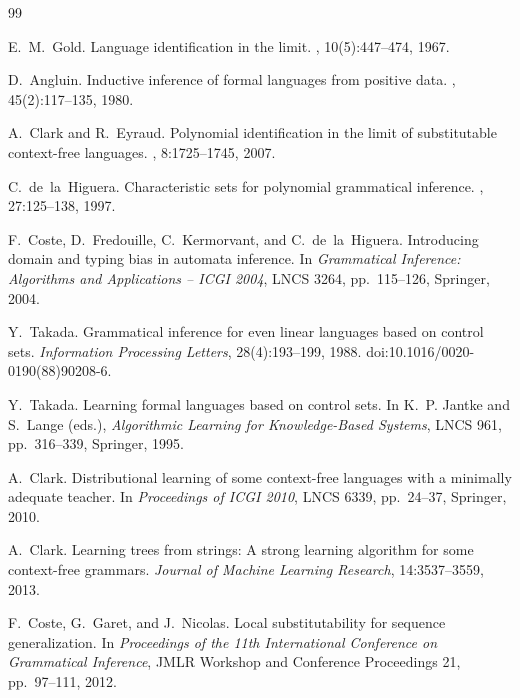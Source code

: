 \documentclass[11pt]{article}
\numberwithin{equation}{section}
\theoremstyle{plain}
\theoremstyle{definition}
\theoremstyle{remark}
\begin{document}
\small
\begin{thebibliography}{99}

E.~M.~Gold.
\newblock Language identification in the limit.
, 10(5):447--474, 1967.

D.~Angluin.
\newblock Inductive inference of formal languages from positive data.
, 45(2):117--135, 1980.

A.~Clark and R.~Eyraud.
\newblock Polynomial identification in the limit of substitutable context-free
languages.
, 8:1725--1745, 2007.

C.~de~la~Higuera.
\newblock Characteristic sets for polynomial grammatical inference.
, 27:125--138, 1997.

F.~Coste, D.~Fredouille, C.~Kermorvant, and C.~de~la~Higuera.
\newblock Introducing domain and typing bias in automata inference.
\newblock In \emph{Grammatical Inference: Algorithms and Applications -- ICGI 2004},
LNCS 3264, pp.~115--126, Springer, 2004.

Y.~Takada.
\newblock Grammatical inference for even linear languages based on control sets.
\newblock \emph{Information Processing Letters}, 28(4):193--199, 1988.
\newblock doi:10.1016/0020-0190(88)90208-6.

Y.~Takada.
\newblock Learning formal languages based on control sets.
\newblock In K.~P. Jantke and S.~Lange (eds.), \emph{Algorithmic Learning
for Knowledge-Based Systems}, LNCS 961, pp.~316--339, Springer, 1995.

A.~Clark.
\newblock Distributional learning of some context-free languages with a minimally adequate teacher.
\newblock In \emph{Proceedings of ICGI 2010}, LNCS 6339, pp.~24--37, Springer, 2010.

A.~Clark.
\newblock Learning trees from strings: A strong learning algorithm for some context-free grammars.
\newblock \emph{Journal of Machine Learning Research}, 14:3537--3559, 2013.

F.~Coste, G.~Garet, and J.~Nicolas.
\newblock Local substitutability for sequence generalization.
\newblock In {\em Proceedings of the 11th International Conference on
Grammatical Inference}, JMLR Workshop and Conference Proceedings 21,
pp.~97--111, 2012.


\end{thebibliography}
\end{document}
